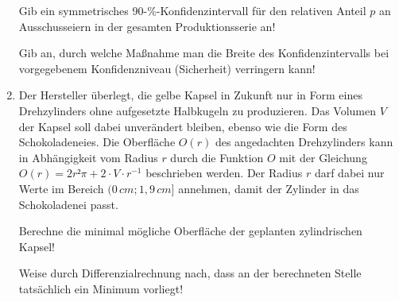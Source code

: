 \begin{langesbeispiel}
\begin{enumerate}
 Gib ein symmetrisches 90-\%-Konfidenzintervall für den relativen Anteil $p$ an Ausschusseiern in der gesamten Produktionsserie an!\leer

 Gib an, durch welche Maßnahme man die Breite des Konfidenzintervalls bei vorgegebenem Konfidenzniveau (Sicherheit) verringern kann!\leer

\item Der Hersteller überlegt, die gelbe Kapsel in Zukunft nur in Form eines Drehzylinders ohne aufgesetzte Halbkugeln zu produzieren. Das Volumen $V$ der Kapsel soll dabei unverändert bleiben, ebenso wie die Form des Schokoladeneies. Die Oberfläche $O(r)$ des angedachten Drehzylinders kann in Abhängigkeit vom Radius $r$ durch die Funktion $O$ mit der Gleichung $O(r)=2r²\pi+2\cdot V\cdot r^{-1}$ beschrieben werden. Der Radius $r$ darf dabei nur Werte im Bereich $(0\,cm; 1,9\,cm]$ annehmen, damit der Zylinder in das Schokoladenei passt.\leer

 Berechne die minimal mögliche Oberfläche der geplanten zylindrischen Kapsel!\leer

 Weise durch Differenzialrechnung nach, dass an der berechneten Stelle tatsächlich ein Minimum vorliegt!
						\end{enumerate}\leer
				
\end{langesbeispiel}

